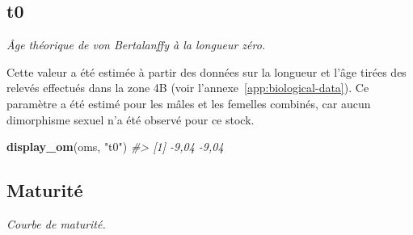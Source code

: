 \documentclass[french,11pt]{book}
\newenvironment{Shaded}{\begin{snugshade}}{\end{snugshade}}
\newcommand{\CommentTok}[1]{\textcolor[rgb]{0.56,0.35,0.01}{\textit{#1}}}
\newcommand{\KeywordTok}[1]{\textcolor[rgb]{0.13,0.29,0.53}{\textbf{#1}}}
\newcommand{\NormalTok}[1]{#1}
\newcommand{\StringTok}[1]{\textcolor[rgb]{0.31,0.60,0.02}{#1}}
\begin{document}
\subsection{t0}
\label{app:desc-stock-t0-yelloweye}

\emph{Âge théorique de von Bertalanffy à la longueur zéro.}

Cette valeur a été estimée à partir des données sur la longueur et l'âge tirées des relevés effectués dans la zone 4B (voir l'annexe~\ref{app:biological-data}). Ce paramètre a été estimé pour les mâles et les femelles combinés, car aucun dimorphisme sexuel n'a été observé pour ce stock.
\begin{Shaded}
\begin{Highlighting}[]
\KeywordTok{display_om}\NormalTok{(oms, }\StringTok{"t0"}\NormalTok{)}
\CommentTok{#> [1] -9,04 -9,04}
\end{Highlighting}
\end{Shaded}
\subsection{Maturité}
\label{app:desc-stock-maturity-yelloweye}

\emph{Courbe de maturité.}
\end{document}
